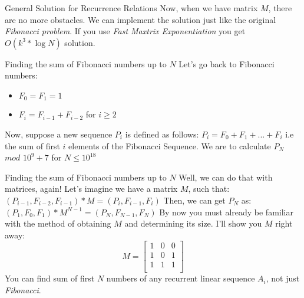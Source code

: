 \documentclass{beamer}
\begin{document}
\begin{frame}{General Solution for Recurrence Relations}
  Now, when we have matrix $M$, there are no more obstacles. 
  \newline
  We can implement the solution just like the original \textit{Fibonacci problem}.
  \newline\newline
  If you use \textit{Fast Maxtrix Exponentiation} you get $O(k^3 * \log{N})$ solution.
\end{frame}

\begin{frame}{Finding the sum of Fibonacci numbers up to $N$}
  Let’s go back to Fibonacci numbers:
  \begin{itemize}
    \item $F_0 = F_1 = 1$
    \item $F_i = F_{i - 1} + F_{i - 2}$ for $i \geq 2$
  \end{itemize}
  Now, suppose a new sequence $P_i$ is defined as follows:
  \newline
  $P_i = F_0 + F_1 + ... + F_i$
  \newline i.e the sum of first $i$ elements of the Fibonacci Sequence.
  \newline We are to calculate $P_N$ $mod$ $10^9 + 7$ for $N \leq 10^{18}$
\end{frame}

\begin{frame}{Finding the sum of Fibonacci numbers up to $N$}
  Well, we can do that with matrices, again!
  \newline Let's imagine we have a matrix $M$, such that:
  \newline
  $(P_{i-1}, F_{i-2}, F_{i-1}) * M = (P_i, F_{i-1}, F_i)$
  \newline
  Then, we can get $P_N$ as:
  \newline
  $(P_1, F_0, F_1) * M^{N-1} = (P_N, F_{N-1}, F_N)$
   \newline
  By now you must already be familiar with the method of 
  obtaining $M$ and determining its size. I'll show you $M$ right away:
  \[
    M = 
    \left[ {
      \begin{array}{ccc}
        1 & 0 & 0 \\
        1 & 0 & 1 \\
        1 & 1 & 1 \\      
      \end{array} } 
    \right]
  \]
  You can find sum of first $N$ numbers of any recurrent linear sequence $A_i$, not just \textit{Fibonacci}.
\end{frame}
\end{document}
